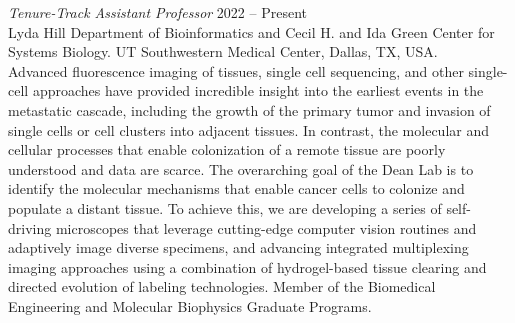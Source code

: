 
{\sl Tenure-Track Assistant Professor} \hfill 2022 -- Present \\ 
Lyda Hill Department of Bioinformatics and Cecil H. and Ida Green Center for Systems Biology. 
\newline UT Southwestern Medical Center, Dallas, TX, USA. \hfill \\
Advanced fluorescence imaging of tissues, single cell sequencing, and other single-cell approaches have provided incredible insight into the earliest events in the metastatic cascade, including the growth of the primary tumor and invasion of single cells or cell clusters into adjacent tissues. In contrast, the molecular and cellular processes that enable colonization of a remote tissue are poorly understood and data are scarce. The overarching goal of the Dean Lab is to identify the molecular mechanisms that enable cancer cells to colonize and populate a distant tissue. To achieve this, we are developing a series of self-driving microscopes that leverage cutting-edge computer vision routines and adaptively image diverse specimens, and advancing integrated multiplexing imaging approaches using a combination of hydrogel-based tissue clearing and directed evolution of labeling technologies. Member of the Biomedical Engineering and Molecular Biophysics Graduate Programs.
\newline

